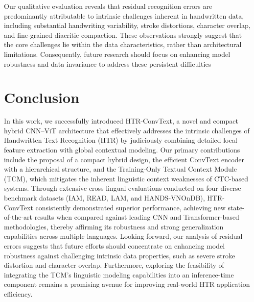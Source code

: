 \documentclass[final,5p,times]{elsarticle}
\begin{document}
Our qualitative evaluation reveals that residual recognition errors are predominantly attributable to intrinsic challenges inherent in handwritten data, including substantial handwriting variability, stroke distortions, character overlap, and fine-grained diacritic compaction. These observations strongly suggest that the core challenges lie within the data characteristics, rather than architectural limitations. Consequently, future research should focus on enhancing model robustness and data invariance to address these persistent difficulties


\section{Conclusion}
In this work, we successfully introduced HTR-ConvText, a novel and compact hybrid CNN–ViT architecture that effectively addresses the intrinsic challenges of Handwritten Text Recognition (HTR) by judiciously combining detailed local feature extraction with global contextual modeling. Our primary contributions include the proposal of a compact hybrid design, the efficient ConvText encoder with a hierarchical structure, and the Training-Only Textual Context Module (TCM), which mitigates the inherent linguistic context weaknesses of CTC-based systems. Through extensive cross-lingual evaluations conducted on four diverse benchmark datasets (IAM, READ, LAM, and HANDS-VNOnDB), HTR-ConvText consistently demonstrated superior performance, achieving new state-of-the-art results when compared against leading CNN and Transformer-based methodologies, thereby affirming its robustness and strong generalization capabilities across multiple languages. Looking forward, our analysis of residual errors suggests that future efforts should concentrate on enhancing model robustness against challenging intrinsic data properties, such as severe stroke distortion and character overlap. Furthermore, exploring the feasibility of integrating the TCM's linguistic modeling capabilities into an inference-time component remains a promising avenue for improving real-world HTR application efficiency.




\end{document}
